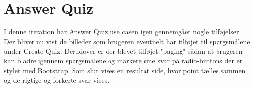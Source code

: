 \section{Answer Quiz}

I denne iteration har Answer Quiz use casen igen gennemgået nogle tilføjelser. Der bliver nu vist de billeder som brugeren eventuelt har tilføjet til spørgsmålene under Create Quiz. Derudover er der blevet tilføjet "paging" sådan at brugeren kan bladre igennem spørgsmålene og markere sine svar på radio-buttons der er stylet med Bootstrap.
Som slut vises en resultat side, hvor point tælles sammen og de rigtige og forkerte svar vises.